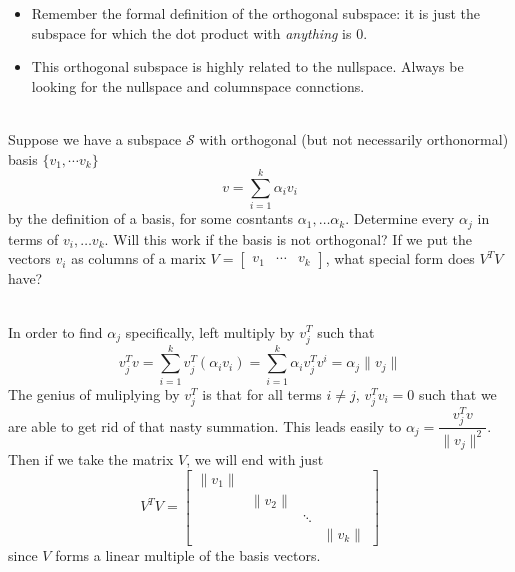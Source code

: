 \documentclass[11pt]{article}
\begin{document}
\begin{itemize}
\begin{examplebox}[1.5]
\begin{solution}[1.5]
		\end{solution}
		\begin{takeaways}[1.5]\quad
		    \begin{itemize}
				\item Remember the formal definition of the orthogonal subspace: it is just the subspace for which the dot product with \textit{anything} is 0. 
				\item This orthogonal subspace is highly related to the nullspace. Always be looking for the nullspace and columnspace connctions.
		    \end{itemize}
		\end{takeaways}
	\end{examplebox}
	\begin{examplebox}[1.6]\quad\\
		Suppose we have a subspace $\mathcal{S}$ with orthogonal (but not necessarily orthonormal) basis $\{ v_1, \cdots v_k\}$
		$$v = \sum_{i=1}^{k} \alpha_{i}v_{i}$$
	   by the definition of a basis, for some cosntants $\alpha_1, \ldots \alpha_k$. Determine every $\alpha_{j}$ in terms of $v_{i}, \ldots v_{k}$. Will this work if the basis is not orthogonal? If we put the vectors $v_{i}$ as columns of a marix $V = \begin{bmatrix}
	     v_{1} & \cdots & v_{k}
	   \end{bmatrix}$, what special form does $V^{T}V$ have?
	   \begin{solution}[1.6]\quad\\
	       In order to find $\alpha_{j}$ specifically, left multiply by $v_{j}^{T}$ such that 
		   $$v_{j}^{T}v = \sum_{i=1}^{k} v_{j}^{T}(\alpha_{i}v_{i}) = \sum_{i=1}^{k} \alpha_{i} v_{j}^{T}v^{i} = \alpha_{j} \|v_{j}\|$$
		   The genius of muliplying by $v_{j}^{T}$ is that for all terms $i \neq j$, $v_{j}^{T}v_{i} = 0$ such that we are able to get rid of that nasty summation. This leads easily to $\alpha_{j} = \dfrac{v_{j}^{T}v}{\|v_{j}\|^2}$. Then if we take the matrix $V$, we will end with just 
		   $$V^{T}V = \begin{bmatrix}
		     \|v_{1}\| &  &  & \\
		    & \|v_{2}\| &  & \\
		    &  & \ddots & \\
		    &  &  & \|v_{k}\|
		   \end{bmatrix}$$
		   since $V$ forms a linear multiple of the basis vectors.
	   \end{solution}
	   \begin{takeaways}[1.6]\quad

\end{takeaways}
\end{examplebox}
\end{itemize}
\end{document}
